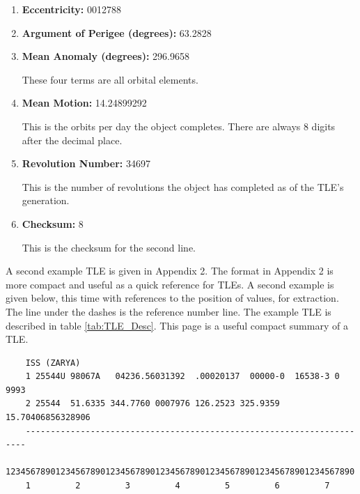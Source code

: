 \documentclass[12pt]{article}
\begin{document}
\begin{enumerate}
		
		\item \textbf{Eccentricity: } 0012788
		
		
		\item \textbf{Argument of Perigee (degrees): }63.2828
		
		
		\item \textbf{Mean Anomaly (degrees): }296.9658
		
		These four terms are all orbital elements.
		
		\item \textbf{Mean Motion: } 14.24899292
		
		This is the orbits per day the object completes. There are always 8 digits after the decimal place. 
		
		\item \textbf{Revolution Number: } 34697
	
		This is the number of revolutions the object has completed as of the TLE's generation.
		
		\item \textbf{Checksum: }8
		
		This is the checksum for the second line.
		
		
		
	\end{enumerate}\doublespacing

\par 
	A second example TLE is given in Appendix 2. The format in Appendix 2 is more compact and useful as a quick reference for TLEs. 
	\iffalse
\newpage	
	\singlespacing
A second example is given below, this time with references to the position of values, for extraction. The line under the dashes is the reference number line. The example TLE is described in table  \ref{tab:TLE_Desc}. This page is a useful compact summary of a TLE.
	\begin{verbatim}
	ISS (ZARYA)
	1 25544U 98067A   04236.56031392  .00020137  00000-0  16538-3 0  9993
	2 25544  51.6335 344.7760 0007976 126.2523 325.9359 15.70406856328906
	----------------------------------------------------------------------
	1234567890123456789012345678901234567890123456789012345678901234567890   
	1         2         3         4         5         6         7
	
	\end{verbatim}%
	
\end{document}
